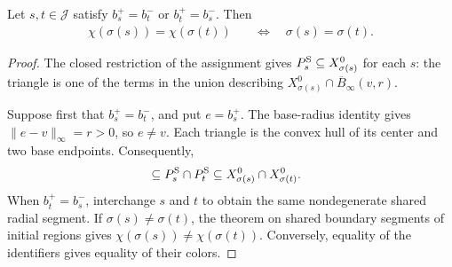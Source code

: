 \begin{lemma}
    \label{thm:area_law_initial_sector_colors}
    \leanok
    Let $s,t\in\mathcal J$ satisfy $b_s^+=b_t^-$ or
    $b_t^+=b_s^-$. Then
    \begin{align}
        \chi(\sigma(s))=\chi(\sigma(t))
         & \quad\Longleftrightarrow\quad \sigma(s)=\sigma(t).
    \end{align}
\end{lemma}
\begin{proof}\leanok
    The closed restriction of the assignment gives
    $P_s^{\rm S}\subseteq X_{\sigma(s)}^0$ for each $s$: the triangle
    is one of the terms in the union describing
    $X_{\sigma(s)}^0\cap\overline B_\infty(v,r)$.

    Suppose first that $b_s^+=b_t^-$, and put $e=b_s^+$.
    The base-radius identity gives $\|e-v\|_\infty=r>0$, so $e\ne v$.
    Each triangle is the convex hull of its center and two base
    endpoints. Consequently,
    \begin{align}
        [v,e] & \subseteq P_s^{\rm S}\cap P_t^{\rm S}
        \subseteq X_{\sigma(s)}^0\cap X_{\sigma(t)}^0.
    \end{align}
    When $b_t^+=b_s^-$, interchange $s$ and $t$ to obtain the same
    nondegenerate shared radial segment. If $\sigma(s)\ne\sigma(t)$,
    the theorem on shared boundary segments of initial regions gives
    $\chi(\sigma(s))\ne\chi(\sigma(t))$.
    Conversely, equality of the identifiers gives
    equality of their colors.
\end{proof}
